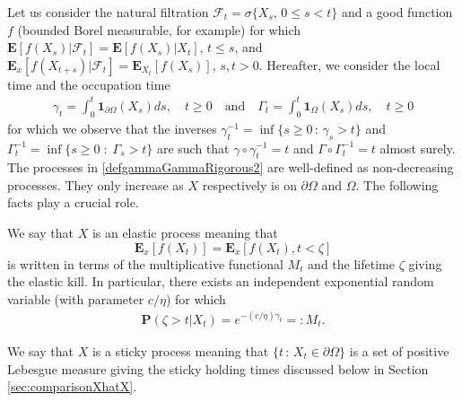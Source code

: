 \documentclass[11pt,a4paper]{article}
\begin{document}
Let us consider the natural filtration $ \mathcal{F}_t = \sigma\{X_s, \, 0\leq s < t\}$ and a good function $f$ (bounded Borel measurable, for example) for which $\mathbf{E}[f(X_s)| \mathcal{F}_t] = \mathbf{E}[f(X_s)|X_t]$, $t\leq s$, and $\mathbf{E}_x [f(X_{t+s}) | \mathcal{F}_t] = \mathbf{E}_{X_t} [f(X_s)]$, $s,t>0$. Hereafter, we consider the local time and the occupation time
\begin{align}
\gamma_t = \int_0^t \mathbf{1}_{\partial \Omega} (X_s) ds, \quad t\geq 0 \quad \textrm{and} \quad \Gamma_t = \int_0^t \mathbf{1}_{\Omega} (X_s) ds, \quad t\geq 0
\label{defgammaGammaRigorous2}
\end{align}
for which we observe that the inverses $\gamma^{-1}_t = \inf\{s\geq 0\,:\, \gamma_s>t\}$ and $\Gamma^{-1}_t = \inf\{s\geq 0\;:\; \Gamma_s >t\}$ are such that $\gamma \circ \gamma^{-1}_t = t$ and $\Gamma \circ \Gamma^{-1}_t = t$ almost surely. The processes in \eqref{defgammaGammaRigorous2} are well-defined as non-decreasing processes. They only increase as $X$ respectively is on $\partial \Omega$ and $\Omega$.  The following facts play a crucial role.


We say that $X$ is an elastic process meaning that 
$$\mathbf{E}_x[f(X_t)] = \mathbf{E}_x[f(X_t), t < \zeta]$$ 
is written in terms of the multiplicative functional $M_t$ and the lifetime $\zeta$ giving the elastic kill. In particular, there exists an independent exponential random variable (with parameter $c/\eta$) for which
\begin{align}
\label{lawExpLT} 
\mathbf{P}(\zeta > t | X_t) = e^{-(c/\eta) \gamma_t}=: M_t.
\end{align}

We say that $X$ is a sticky process meaning that $\{t\,:\, X_t \in \partial \Omega\}$ is a set of positive Lebesgue measure giving the sticky holding times discussed below in Section \ref{sec:comparisonXhatX}.
\end{document}
